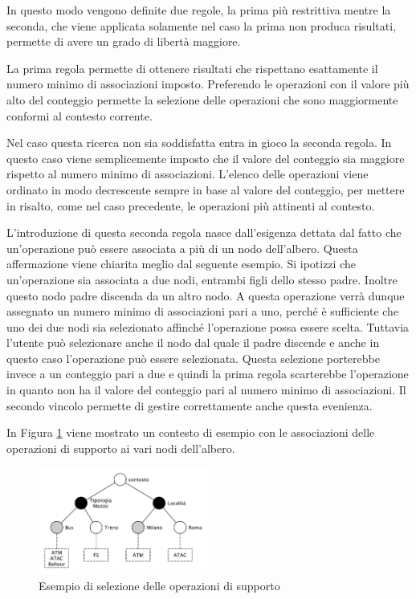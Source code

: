 In questo modo vengono definite due regole, la prima più restrittiva mentre la seconda, che viene applicata solamente nel caso la prima non produca risultati, permette di avere un grado di libertà maggiore.

La prima regola permette di ottenere risultati che rispettano esattamente il numero minimo di associazioni imposto. Preferendo le operazioni con il valore più alto del conteggio permette la selezione delle operazioni che sono maggiormente conformi al contesto corrente.

Nel caso questa ricerca non sia soddisfatta entra in gioco la seconda regola. In questo caso viene semplicemente imposto che il valore del conteggio sia maggiore rispetto al numero minimo di associazioni. L'elenco delle operazioni viene ordinato in modo decrescente sempre in base al valore del conteggio, per mettere in risalto, come nel caso precedente, le operazioni più attinenti al contesto.

L'introduzione di questa seconda regola nasce dall'esigenza dettata dal fatto che un'operazione può essere associata a più di un nodo dell'albero. Questa affermazione viene chiarita meglio dal seguente esempio. Si ipotizzi che un'operazione sia associata a due nodi, entrambi figli dello stesso padre. Inoltre questo nodo padre discenda da un altro nodo. A questa operazione verrà dunque assegnato un numero minimo di associazioni pari a uno, perché è sufficiente che uno dei due nodi sia selezionato affinché l'operazione possa essere scelta. Tuttavia l'utente può selezionare anche il nodo dal quale il padre discende e anche in questo caso l'operazione può essere selezionata. Questa selezione porterebbe invece a un conteggio pari a due e quindi la prima regola scarterebbe l'operazione in quanto non ha il valore del conteggio pari al numero minimo di associazioni. Il secondo vincolo permette di gestire correttamente anche questa evenienza.

In Figura \ref{fig:esempio-selezione-supporto} viene mostrato un contesto di esempio con le associazioni delle operazioni di supporto ai vari nodi dell'albero.

\begin{figure}[ht]
	\centering
	\includegraphics[width=0.5\textwidth]{4-metodologia/Immagini/esempio-selezione-supporto.pdf}
	\caption{Esempio di selezione delle operazioni di supporto}\label{fig:esempio-selezione-supporto}
\end{figure}

